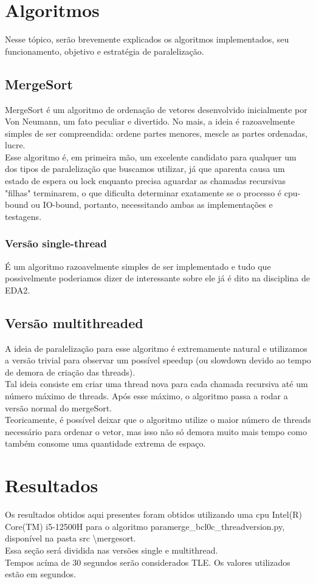 \documentclass{article}
\begin{document}
\section{Algoritmos}\label{algoritmos}
Nesse tópico, serão brevemente explicados os algoritmos implementados, seu funcionamento, objetivo e estratégia de paralelização.

\subsection{MergeSort}
MergeSort é um algoritmo de ordenação de vetores desenvolvido inicialmente por Von Neumann, um fato peculiar e divertido. No mais, a ideia é razoavelmente simples de ser compreendida: ordene partes menores, mescle as partes ordenadas, lucre.\\
Esse algoritmo é, em primeira mão, um excelente candidato para qualquer um dos tipos de paralelização que buscamos utilizar, já que aparenta causa um estado de espera ou lock enquanto precisa aguardar as chamadas recursivas "filhas" terminarem, o que dificulta determinar exatamente se o processo é cpu-bound ou IO-bound, portanto, necessitando ambas as implementações e testagens.\\
\subsubsection{Versão single-thread}
É um algoritmo razoavelmente simples de ser implementado e tudo que possivelmente poderiamos dizer de interessante sobre ele já é dito na disciplina de EDA2.

\subsection{Versão multithreaded}
A ideia de paralelização para esse algoritmo é extremamente natural e utilizamos a versão trivial para observar um possível speedup (ou slowdown devido ao tempo de demora de criação das threads).\\
Tal ideia consiste em criar uma thread nova para cada chamada recursiva até um número máximo de threads. Após esse máximo, o algoritmo passa a rodar a versão normal do mergeSort.\\
Teoricamente, é possível deixar que o algoritmo utilize o maior número de threads necessário para ordenar o vetor, mas isso não só demora muito mais tempo como também consome uma quantidade extrema de espaço.

\section{Resultados}
Os resultados obtidos aqui presentes foram obtidos utilizando uma cpu Intel(R) Core(TM) i5-12500H para o algoritmo paramerge\_bcl0c\_threadversion.py, disponível na pasta src \textbackslash mergesort.\\
Essa seção será dividida nas versões single e multithread.\\
Tempos acíma de 30 segundos serão considerados TLE. Os valores utilizados estão em segundos.\\
\end{document}
